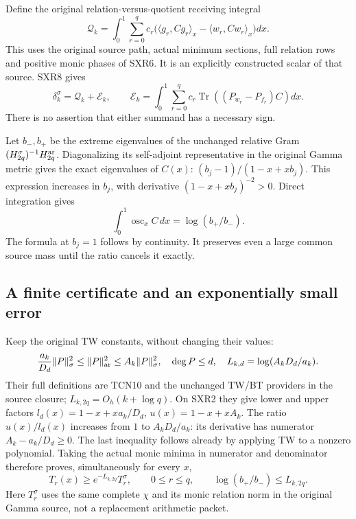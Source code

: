 \documentclass[11pt,a4paper]{article}
\begin{document}
Define the original relation-versus-quotient receiving integral
\begin{equation}\tag{SXR11}
 \mathcal Q_k=\int_0^1\sum_{r=0}^q c_r
  \bigl(\langle g_r,Cg_r\rangle_x
                  -\langle w_r,Cw_r\rangle_x\bigr)dx.
\end{equation}
This uses the original source path, actual minimum sections, full
relation rows and positive monic phases of SXR6. It is an explicitly
constructed scalar of that source. SXR8 gives
\begin{equation}\tag{SXR12}
 \delta_k^\sigma=\mathcal Q_k+\mathcal E_k,\qquad
 \mathcal E_k=\int_0^1\sum_{r=0}^q c_r
          \operatorname{Tr}((P_{w_r}-P_{f_r})C)dx.
\end{equation}
There is no assertion that either summand has a necessary sign.

Let $b_-,b_+$ be the extreme eigenvalues of the unchanged relative
Gram $(H_{2q}^\sigma)^{-1}H_{2q}^{\rm ar}$. Diagonalizing its
self-adjoint representative in the original Gamma metric gives
the exact eigenvalues of $C(x)$:
$(b_j-1)/(1-x+xb_j)$. This expression increases in $b_j$,
with derivative $(1-x+xb_j)^{-2}>0$. Direct integration gives
\begin{equation}\tag{SXR13}
 \int_0^1\operatorname{osc}_x C\,dx
       =\log(b_+/b_-).
\end{equation}
The formula at $b_j=1$ follows by continuity. It preserves even a
large common source mass until the ratio cancels it exactly.

\subsection{A finite certificate and an exponentially small error}

Keep the original TW constants, without changing their values:
\[
 \frac{a_k}{D_d}\|P\|_\sigma^2\le\|P\|_{\rm ar}^2
                      \le A_k\|P\|_\sigma^2,
 \quad \deg P\le d,\quad
 L_{k,d}=\log(A_kD_d/a_k).
\]
Their full definitions are TCN10 and the unchanged TW/BT providers
in the source closure; $L_{k,2q}=O_h(k+\log q)$. On SXR2 they
give lower and upper factors
$l_d(x)=1-x+x a_k/D_d$, $u(x)=1-x+xA_k$.
The ratio $u(x)/l_d(x)$ increases from $1$ to
$A_kD_d/a_k$: its derivative has numerator $A_k-a_k/D_d\ge0$.
The last inequality follows already by applying TW to a nonzero
polynomial. Taking the actual monic minima in numerator and
denominator therefore proves, simultaneously for every $x$,
\begin{equation}\tag{SXR14}
 T_r(x)\ge e^{-L_{k,2q}}T_r^\sigma,
 \qquad 0\le r\le q,\qquad
 \log(b_+/b_-)\le L_{k,2q}.
\end{equation}
Here $T_r^\sigma$ uses the same complete $\chi$ and its monic
relation norm in the original Gamma source, not a replacement
arithmetic packet.
\end{document}

